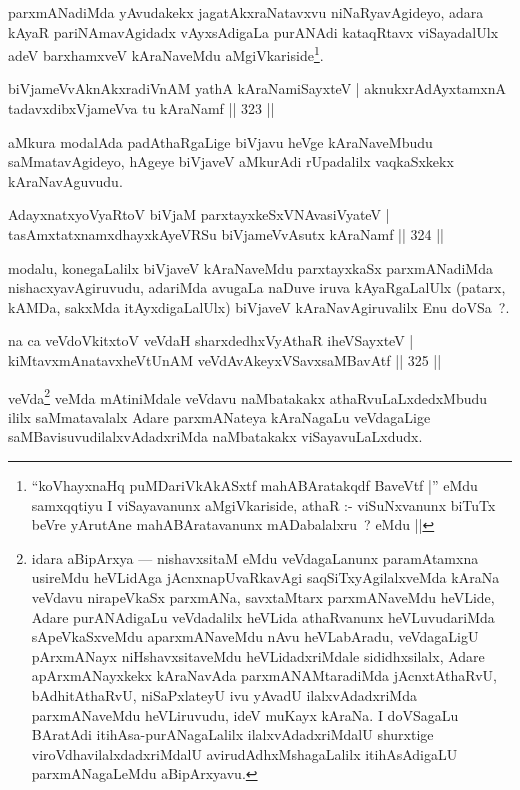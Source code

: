 \begin{artha}
parxmANadiMda yAvudakekx jagatAkxraNatavxvu niNaRyavAgideyo, adara kAyaR pariNAmavAgidadx vAyxsAdigaLa purANAdi kataqRtavx viSayadalUlx adeV barxhamxveV kAraNaveMdu aMgiVkariside\footnote{``koVhayxnaHq puMDariVkAkASxtf mahABAratakqdf BaveVtf |'' eMdu samxqqtiyu I viSayavanunx aMgiVkariside, athaR :- viSuNxvanunx biTuTx beVre yArutAne mahABAratavanunx mADabalalxru~? eMdu ||}.
\end{artha}


\begin{shl}
biVjameVvAknAkxradiVnAM yathA kAraNamiSayxteV |
aknukxrAdAyxtamxnA tadavxdibxVjameVva tu kAraNamf \hfill || 323 ||
\end{shl}

\begin{artha}
aMkura modalAda padAthaRgaLige biVjavu heVge kAraNaveMbudu saMmatavAgideyo, hAgeye biVjaveV aMkurAdi rUpadalilx vaqkaSxkekx kAraNavAguvudu.
\end{artha}

		\begin{shl}
AdayxnatxyoVyaRtoV biVjaM parxtayxkeSxVNAvasiVyateV |
tasAmxtatxnamxdhayxkAyeVRSu biVjameVvAsutx kAraNamf \hfill || 324 ||
\end{shl}

\begin{artha}
modalu, konegaLalilx biVjaveV kAraNaveMdu parxtayxkaSx parxmANadiMda nishacxyavAgiruvudu, adariMda avugaLa naDuve iruva kAyaRgaLalUlx (patarx, kAMDa, sakxMda itAyxdigaLalUlx) biVjaveV kAraNavAgiruvalilx Enu doVSa~?.
\end{artha}


\begin{shl}
na ca veVdoVkitxtoV veVdaH sharxdedhxVyAthaR iheVSayxteV |
kiMtavxmAnatavxheVtUnAM veVdAvAkeyxVSavxsaMBavAtf \hfill || 325 ||
\end{shl}

\begin{artha}
veVda\footnote{idara aBipArxya  {\rm ---}  nishavxsitaM eMdu veVdagaLanunx paramAtamxna usireMdu heVLidAga jAcnxnapUvaRkavAgi saqSiTxyAgilalxveMda kAraNa veVdavu nirapeVkaSx parxmANa, savxtaMtarx parxmANaveMdu heVLide, Adare purANAdigaLu veVdadalilx heVLida athaRvanunx heVLuvudariMda sApeVkaSxveMdu aparxmANaveMdu nAvu heVLabAradu, veVdagaLigU pArxmANayx niHshavxsitaveMdu heVLidadxriMdale sididhxsilalx, Adare apArxmANayxkekx kAraNavAda parxmANAMtaradiMda jAcnxtAthaRvU, bAdhitAthaRvU, niSaPxlateyU ivu yAvadU ilalxvAdadxriMda parxmANaveMdu heVLiruvudu, ideV muKayx kAraNa. I doVSagaLu BAratAdi itihAsa-purANagaLalilx ilalxvAdadxriMdalU shurxtige viroVdhavilalxdadxriMdalU avirudAdhxMshagaLalilx itihAsAdigaLU parxmANagaLeMdu aBipArxyavu.} veMda mAtiniMdale veVdavu naMbatakakx athaRvuLaLxdedxMbudu ililx  saMmatavalalx Adare parxmANateya kAraNagaLu veVdagaLige saMBavisuvudilalxvAdadxriMda naMbatakakx viSayavuLaLxdudx.
\end{artha}

